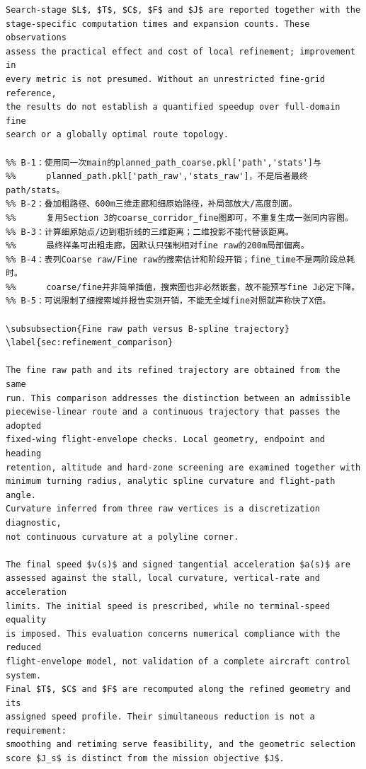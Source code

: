 \documentclass[12pt]{article}
\begin{document}
\begin{verbatim}
Search-stage $L$, $T$, $C$, $F$ and $J$ are reported together with the
stage-specific computation times and expansion counts. These observations
assess the practical effect and cost of local refinement; improvement in
every metric is not presumed. Without an unrestricted fine-grid reference,
the results do not establish a quantified speedup over full-domain fine
search or a globally optimal route topology.

%% B-1：使用同一次main的planned_path_coarse.pkl['path','stats']与
%%      planned_path.pkl['path_raw','stats_raw']，不是后者最终path/stats。
%% B-2：叠加粗路径、600m三维走廊和细原始路径，补局部放大/高度剖面。
%%      复用Section 3的coarse_corridor_fine图即可，不重复生成一张同内容图。
%% B-3：计算细原始点/边到粗折线的三维距离；二维投影不能代替该距离。
%%      最终样条可出粗走廊，因默认只强制相对fine raw的200m局部偏离。
%% B-4：表列Coarse raw/Fine raw的搜索估计和阶段开销；fine_time不是两阶段总耗时。
%%      coarse/fine并非简单插值，搜索图也非必然嵌套，故不能预写fine J必定下降。
%% B-5：可说限制了细搜索域并报告实测开销，不能无全域fine对照就声称快了X倍。

\subsubsection{Fine raw path versus B-spline trajectory}
\label{sec:refinement_comparison}

The fine raw path and its refined trajectory are obtained from the same
run. This comparison addresses the distinction between an admissible
piecewise-linear route and a continuous trajectory that passes the adopted
fixed-wing flight-envelope checks. Local geometry, endpoint and heading
retention, altitude and hard-zone screening are examined together with
minimum turning radius, analytic spline curvature and flight-path angle.
Curvature inferred from three raw vertices is a discretization diagnostic,
not continuous curvature at a polyline corner.

The final speed $v(s)$ and signed tangential acceleration $a(s)$ are
assessed against the stall, local curvature, vertical-rate and acceleration
limits. The initial speed is prescribed, while no terminal-speed equality
is imposed. This evaluation concerns numerical compliance with the reduced
flight-envelope model, not validation of a complete aircraft control system.
Final $T$, $C$ and $F$ are recomputed along the refined geometry and its
assigned speed profile. Their simultaneous reduction is not a requirement:
smoothing and retiming serve feasibility, and the geometric selection
score $J_s$ is distinct from the mission objective $J$.


\end{verbatim}
\end{document}

